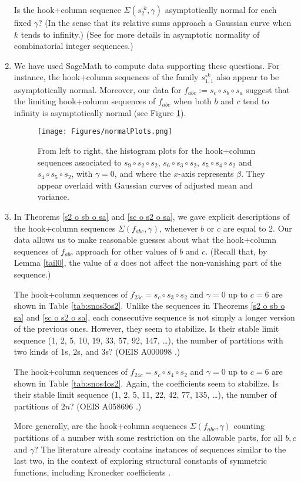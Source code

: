 \documentclass[twoside]{article}
\begin{document}
\begin{enumerate}
Is the hook+column sequence $\Sigma({s_2^{\circ k}},\gamma)$ asymptotically normal for each fixed $\gamma$? (In the sense that its relative sums approach a Gaussian curve when $k$ tends to infinity.)
(See \cite{billey, charalambides, harper} for more details in asymptotic normality of combinatorial integer sequences.)

\item
We have used SageMath \cite{sage} to compute   data supporting these questions. For instance, the hook+column sequences of the family $s_{1,1}^{\circ k}$ also appear to be asymptotically normal. Moreover, our data for $f_{abc} := s_c\circ s_b\circ s_a$ suggest that the limiting hook+column sequences of $f_{abc}$ when both $b$ and $c$ tend to infinity is asymptotically normal (see Figure \ref{fig:normalPlots}).

\begin{figure}[H]
    \centering
    \texttt{[image: Figures/normalPlots.png]}
    \caption{From left to right, the histogram plots for the hook+column sequences associated to $s_9\circ s_2\circ s_2$, $s_6\circ s_3\circ s_2$, $s_5\circ s_4\circ s_2$ and $s_4\circ s_5\circ s_2$, with $\gamma=0$, and where the $x$-axis represents $\beta$. They appear overlaid with Gaussian curves of adjusted mean and variance.}
    \label{fig:normalPlots}
\end{figure}

 \item In Theorems \ref{s2 o sb o sa} and \ref{sc o s2 o sa}, we gave explicit descriptions of the hook+column sequences $\Sigma(f_{abc}, \gamma)$, whenever $b$ or $c$ are equal to 2. Our data allows us to make reasonable guesses about what the hook+column sequences of $f_{abc}$ approach for other values of $b$ and $c$. (Recall that, by Lemma \ref{tail0}, the value of $a$ does not affect the non-vanishing part of the sequence.)
 
The hook+column sequences of $f_{23c}=s_c\circ s_3 \circ s_2$ and $\gamma=0$ up to $c=6$ are shown in Table \ref{tab:snos3os2}. 
Unlike the sequences in Theorems \ref{s2 o sb o sa}
and \ref{sc o s2 o sa}, each consecutive sequence is not simply a longer version of the previous ones. However, they seem to stabilize. Is their stable limit sequence (1, 2, 5, 10, 19, 33, 57, 92, 147, \ldots),
the number of partitions with two kinds of 1s, 2s, and 3s? (OEIS A000098 \cite{oeis}.)

The hook+column sequences of $f_{24c}=s_c\circ s_4 \circ s_2$ and $\gamma=0$ up to $c=6$ are shown in Table \ref{tab:snos4os2}. Again, the coefficients seem to stabilize. Is their stable limit sequence (1, 2, 5, 11, 22, 42, 77, 135, \ldots),
the number of partitions of $2n$? (OEIS A058696 \cite{oeis}.)

More generally, are the hook+column sequences $\Sigma(f_{abc}, \gamma)$ counting partitions of a number with some restriction  on the
allowable parts, for all $b, c$ and $\gamma$? 
The literature already contains instances of sequences similar to the last two, in the context of exploring structural constants of symmetric functions, including Kronecker coefficients \cite{colmenarejo15}.
\end{enumerate}
\end{document}
